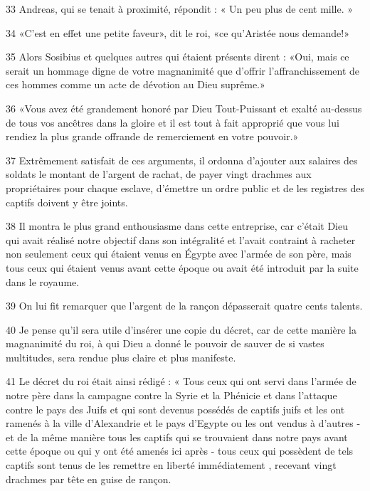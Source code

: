 \par 33 Andreas, qui se tenait à proximité, répondit : « Un peu plus de cent mille. »

\par 34 «C'est en effet une petite faveur», dit le roi, «ce qu'Aristée nous demande!»

\par 35 Alors Sosibius et quelques autres qui étaient présents dirent : «Oui, mais ce serait un hommage digne de votre magnanimité que d'offrir l'affranchissement de ces hommes comme un acte de dévotion au Dieu suprême.»

\par 36 «Vous avez été grandement honoré par Dieu Tout-Puissant et exalté au-dessus de tous vos ancêtres dans la gloire et il est tout à fait approprié que vous lui rendiez la plus grande offrande de remerciement en votre pouvoir.»

\par 37 Extrêmement satisfait de ces arguments, il ordonna d'ajouter aux salaires des soldats le montant de l'argent de rachat, de payer vingt drachmes aux propriétaires pour chaque esclave, d'émettre un ordre public et de les registres des captifs doivent y être joints.

\par 38 Il montra le plus grand enthousiasme dans cette entreprise, car c'était Dieu qui avait réalisé notre objectif dans son intégralité et l'avait contraint à racheter non seulement ceux qui étaient venus en Égypte avec l'armée de son père, mais tous ceux qui étaient venus avant cette époque ou avait été introduit par la suite dans le royaume.

\par 39 On lui fit remarquer que l'argent de la rançon dépasserait quatre cents talents.

\par 40 Je pense qu'il sera utile d'insérer une copie du décret, car de cette manière la magnanimité du roi, à qui Dieu a donné le pouvoir de sauver de si vastes multitudes, sera rendue plus claire et plus manifeste.

\par 41 Le décret du roi était ainsi rédigé : « Tous ceux qui ont servi dans l'armée de notre père dans la campagne contre la Syrie et la Phénicie et dans l'attaque contre le pays des Juifs et qui sont devenus possédés de captifs juifs et les ont ramenés à la ville d'Alexandrie et le pays d'Egypte ou les ont vendus à d'autres - et de la même manière tous les captifs qui se trouvaient dans notre pays avant cette époque ou qui y ont été amenés ici après - tous ceux qui possèdent de tels captifs sont tenus de les remettre en liberté immédiatement , recevant vingt drachmes par tête en guise de rançon.

